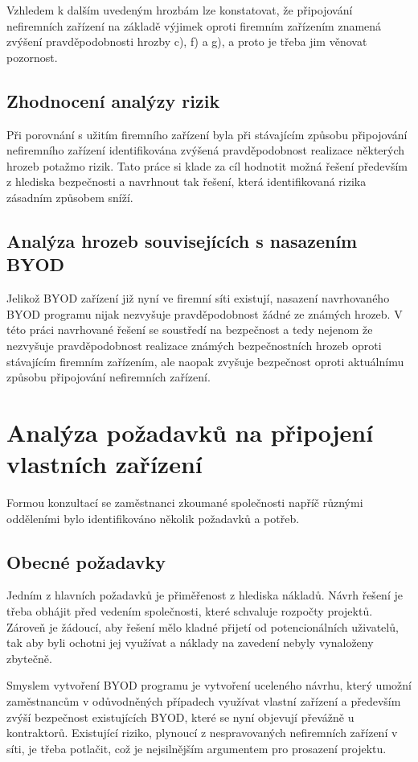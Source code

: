 Vzhledem k dalším uvedeným hrozbám lze konstatovat, že připojování nefiremních zařízení na základě výjimek oproti firemním zařízením znamená zvýšení pravděpodobnosti hrozby c), f) a g), a proto je třeba jim věnovat pozornost. 

\subsection{Zhodnocení analýzy rizik}\label{analyzaRizik}
Při porovnání s užitím firemního zařízení byla při stávajícím způsobu připojování nefiremního zařízení identifikována zvýšená pravděpodobnost realizace některých hrozeb potažmo rizik. Tato práce si klade za cíl hodnotit možná řešení především z hlediska bezpečnosti a navrhnout tak řešení, která identifikovaná rizika zásadním způsobem sníží.

\subsection{Analýza hrozeb souvisejících s nasazením BYOD}
Jelikož BYOD zařízení již nyní ve firemní síti existují, nasazení navrhovaného BYOD programu nijak nezvyšuje pravděpodobnost žádné ze známých hrozeb. V této práci navrhované řešení se soustředí na bezpečnost a tedy nejenom že nezvyšuje pravděpodobnost realizace známých bezpečnostních hrozeb oproti stávajícím firemním zařízením, ale naopak zvyšuje bezpečnost oproti aktuálnímu způsobu připojování nefiremních zařízení.


\section{Analýza požadavků na připojení vlastních zařízení} 
Formou konzultací se zaměstnanci zkoumané společnosti napříč různými odděleními bylo identifikováno několik požadavků a potřeb.

\subsection{Obecné požadavky}\label{obecnePozadavky}

Jedním z hlavních požadavků je přiměřenost z hlediska nákladů. Návrh řešení je třeba obhájit před vedením společnosti, které schvaluje rozpočty projektů. Zároveň je žádoucí, aby řešení mělo kladné přijetí od potencionálních uživatelů, tak aby byli ochotni jej využívat a náklady na zavedení nebyly vynaloženy zbytečně.  

Smyslem vytvoření BYOD programu je vytvoření uceleného návrhu, který umožní zaměstnancům v odůvodněných případech využívat vlastní zařízení a především zvýší bezpečnost existujících BYOD, které se nyní objevují převážně u kontraktorů. Existující riziko, plynoucí z nespravovaných nefiremních zařízení v síti, je třeba potlačit, což je nejsilnějším argumentem pro prosazení projektu.

